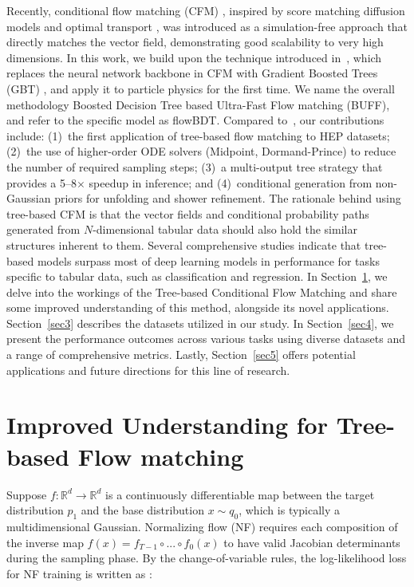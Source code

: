 \documentclass[%
 reprint,
 amsmath,amssymb,
 aps,
prd,
floatfix,
]{revtex4-2}
\begin{document}
Recently, conditional flow matching (CFM) \cite{cfm}, inspired by score matching diffusion models \cite{score} and optimal transport \cite{ot}, was introduced as a simulation-free approach that directly matches the vector field, demonstrating good scalability to very high dimensions. In this work, we build upon the technique introduced in~\cite{flowbdt}, which replaces the neural network backbone in CFM with Gradient Boosted Trees (GBT) \cite{bdt,gbt}, and apply it to particle physics for the first time. We name the overall methodology Boosted Decision Tree based Ultra-Fast Flow matching (BUFF), and refer to the specific model as flowBDT. Compared to~\cite{flowbdt}, our contributions include: (1)~the first application of tree-based flow matching to HEP datasets; (2)~the use of higher-order ODE solvers (Midpoint, Dormand-Prince) to reduce the number of required sampling steps; (3)~a multi-output tree strategy that provides a 5--8$\times$ speedup in inference; and (4)~conditional generation from non-Gaussian priors for unfolding and shower refinement. The rationale behind using tree-based CFM is that the vector fields and conditional probability paths generated from $N$-dimensional tabular data should also hold the similar structures inherent to them. Several comprehensive studies \cite{bdtbetter1,bdtbetter2} indicate that tree-based models surpass most of deep learning models in performance for tasks specific to tabular data, such as classification and regression. In Section~\ref{sec2}, we delve into the workings of the Tree-based Conditional Flow Matching and share some improved understanding of this method, alongside its novel applications. Section~\ref{sec3} describes the datasets utilized in our study. In Section~\ref{sec4}, we present the performance outcomes across various tasks using diverse datasets and a range of comprehensive metrics. Lastly, Section~\ref{sec5} offers potential applications and future directions for this line of research.



\section{Improved Understanding for Tree-based Flow matching}\label{sec2}

Suppose $f: \mathbb{R}^d \rightarrow \mathbb{R}^d$ is a continuously differentiable map between the target distribution $p_1$ and the base distribution $x \sim q_0$, which is typically a multidimensional Gaussian. Normalizing flow (NF) requires each composition of the inverse map $f(x) = f_{T-1}\circ...\circ f_{0}(x)$ to have valid Jacobian determinants during the sampling phase. By the change-of-variable rules, the log-likelihood loss for NF training is written as \cite{glow}:
\end{document}
